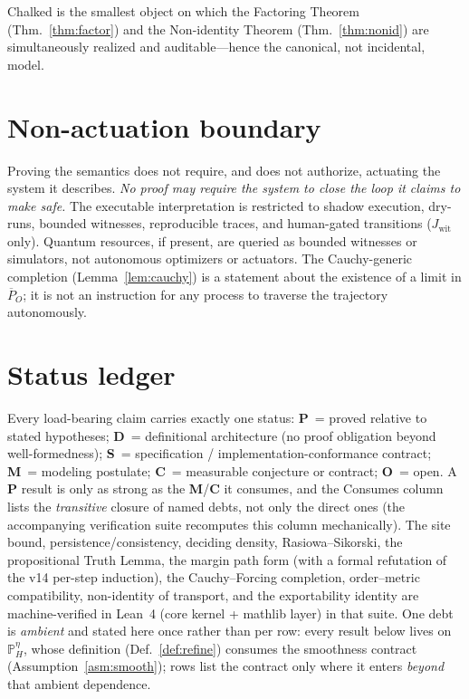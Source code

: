 \documentclass[11pt]{article}
\theoremstyle{definition}
\theoremstyle{remark}
\newcommand{\PHeta}{\mathbb{P}_{H}^{\eta}}
\newcommand{\Jwit}{J_{\mathrm{wit}}}
\begin{document}
Chalked is the smallest object on which the Factoring Theorem (Thm.~\ref{thm:factor}) and the
Non-identity Theorem (Thm.~\ref{thm:nonid}) are simultaneously realized and auditable---hence the
canonical, not incidental, model.

\section{Non-actuation boundary}

Proving the semantics does not require, and does not authorize, actuating the system it describes.
\emph{No proof may require the system to close the loop it claims to make safe.} The executable
interpretation is restricted to shadow execution, dry-runs, bounded witnesses, reproducible traces,
and human-gated transitions ($\Jwit$ only). Quantum resources, if present, are queried as bounded
witnesses or simulators, not autonomous optimizers or actuators. The Cauchy-generic completion
(Lemma~\ref{lem:cauchy}) is a statement about the existence of a limit in $\overline{P}_O$; it is not
an instruction for any process to traverse the trajectory autonomously.

\section{Status ledger}\label{sec:ledger}

Every load-bearing claim carries exactly one status: \textbf{P}~= proved relative to stated
hypotheses; \textbf{D}~= definitional architecture (no proof obligation beyond well-formedness);
\textbf{S}~= specification / implementation-conformance contract; \textbf{M}~= modeling postulate;
\textbf{C}~= measurable conjecture or contract; \textbf{O}~= open. A \textbf{P} result is only as
strong as the \textbf{M}/\textbf{C} it consumes, and the Consumes column lists the \emph{transitive}
closure of named debts, not only the direct ones (the accompanying verification suite recomputes
this column mechanically). The site bound, persistence/consistency, deciding density,
Rasiowa--Sikorski, the propositional Truth Lemma, the margin path form (with a formal refutation of
the v14 per-step induction), the Cauchy--Forcing completion, order--metric compatibility,
non-identity of transport, and the exportability identity are machine-verified in Lean~4 (core
kernel + mathlib layer) in that suite. One debt is \emph{ambient} and stated here once rather than per row:
every result below lives on $\PHeta$, whose definition (Def.~\ref{def:refine}) consumes the
smoothness contract (Assumption~\ref{asm:smooth}); rows list the contract only where it enters
\emph{beyond} that ambient dependence.
\end{document}
